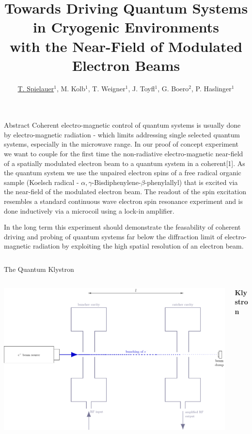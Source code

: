 \documentclass[final]{beamer}
\title{Towards Driving Quantum Systems in Cryogenic Environments\hspace*{1cm} \\ with the Near-Field of Modulated Electron Beams}
\author{\underline{T. Spielauer$^{1}$}, M. Kolb$^{1}$, T. Weigner$^{1}$, J. Toyfl$^{1}$, G. Boero$^{2}$, P. Haslinger$^{1}$ }
\institute[]{
  {\small
  $^{1}$VCQ, Technische Universität Wien, Atominstitut, Stadionallee 2, 1020 Vienna, Austria; $^{2}$EPFL, BM 3110 Station 17, CH-1015 Lausanne, Switzerland
  }
}
\begin{document}
\begin{frame}[fragile]{}
  \begin{block}{\Large Abstract}
    Coherent electro-magnetic control of quantum systems is usually done by
    electro-magnetic radiation - which limits addressing single selected
    quantum systems, especially in the microwave range. In our proof of concept
    experiment we want to couple for the first time the non-radiative electro-magnetic
    near-field of a spatially modulated electron beam to a quantum system in
    a coherent[1].  As the quantum system we
    use the unpaired electron spins of a free radical organic sample (Koelsch radical
    - $\alpha,\gamma$-Bisdiphenylene-$\beta$-phenylallyl) that is excited via the
    near-field of the modulated electron beam. The readout of the spin excitation
    resembles a standard continuous wave electron spin resonance experiment and is
    done inductively via a microcoil using a lock-in amplifier.

    In the long term this experiment should demonstrate the feasability of
    coherent driving and probing of quantum systems far below the diffraction
    limit of electro-magnetic radiation by exploiting the high spatial resolution of an
    electron beam.
  \end{block}
  \begin{columns}[T]
    \begin{column}{.49\linewidth}
      \begin{block}{\Large The Quantum Klystron}

        \begin{columns}
          \begin{column}{0.4\columnwidth}
              \includegraphics[width=\columnwidth]{figures/klystron.pdf}
          \end{column}
          \begin{column}{0.6\columnwidth}\begin{center}
              {\large \textbf{Klystron}}
            \end{center}


\end{column}
\end{columns}
\end{block}
\end{column}
\end{columns}
\end{frame}
\end{document}
